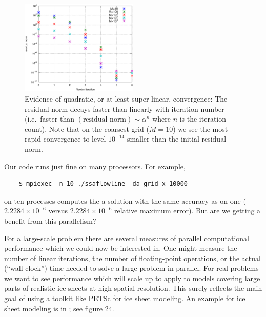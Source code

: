 \documentclass[11pt,final,reqno]{amsart}
\begin{document}
\begin{figure}[ht] 
\begin{center}
\includegraphics[width=0.5\textwidth]{quadconv}
\end{center}
\caption{Evidence of quadratic, or at least super-linear, convergence:  The residual norm decays faster than linearly with iteration number (i.e.~faster than $(\text{residual norm})\sim \alpha^n$ where $n$ is the iteration count).  Note that on the coarsest grid ($M=10$) we see the most rapid convergence to level $10^{-14}$ smaller than the initial residual norm.}
\label{fig:quadconv}
\end{figure}

Our code runs just fine on many processors.  For example,
\begin{Verbatim}
    $ mpiexec -n 10 ./ssaflowline -da_grid_x 10000
\end{Verbatim}
on ten processes computes the a solution with the same accuracy as on one ($2.2284\times 10^{-6}$ versus $2.2284\times 10^{-6}$ relative maximum error).  But are we getting a benefit from this parallelism?

For a large-scale problem there are several measures of parallel computational performance which we could now be interested in.  One might measure the number of linear iterations, the number of floating-point operations, or the actual (``wall clock'') time needed to solve a large problem in parallel.  For real problems we want to see performance which will scale up to apply to models covering large parts of realistic ice sheets at high spatial resolution.  This surely reflects the main goal of using a toolkit like PETSc for ice sheet modeling.  An example for ice sheet modeling is in \cite{BBssasliding}; see figure 24.
\end{document}
